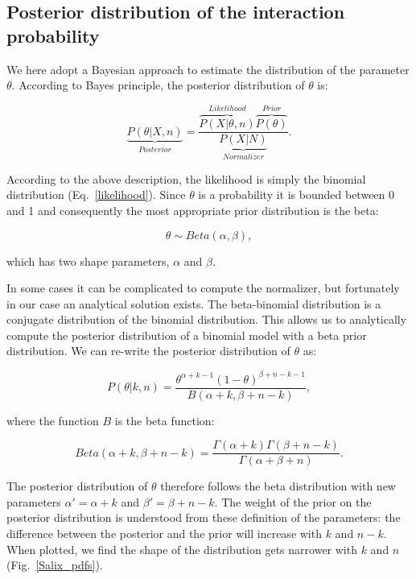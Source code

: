 \documentclass[12pt]{article}
\begin{document}
    \subsection*{Posterior distribution of the interaction probability}

      We here adopt a Bayesian approach to estimate the distribution of the parameter $\theta$. According to Bayes principle, the posterior distribution of $\theta$ is:

      \begin{equation}
        \underbrace{P(\theta|X,n)}_{Posterior} = \frac{\overbrace{P(X|\theta,n)}^{Likelihood}\overbrace{P(\theta)}^{Prior}}{\underbrace{P(X|N)}_{Normalizer}} .
        \label{posterior}
      \end{equation}

      According to the above description, the likelihood is simply the binomial distribution (Eq.~\ref{likelihood}). Since $\theta$ is a probability it is bounded between 0 and 1 and consequently the most appropriate prior distribution is the beta:

      \begin{equation}
        \theta \sim Beta(\alpha,\beta) , \label{prior}
      \end{equation}

      \noindent which has two shape parameters, $\alpha$ and $\beta$. 

     In some cases it can be complicated to compute the normalizer, but fortunately in our case an analytical solution exists. The beta-binomial distribution is a conjugate distribution of the binomial distribution. This allows us to analytically compute the posterior distribution of a binomial model with a beta prior distribution. We can re-write the posterior distribution of $\theta$ as:

      \begin{equation}
        P(\theta|k,n) = \frac{\theta^{\alpha+k-1}(1-\theta)^{\beta+n-k-1}}{B(\alpha+k,\beta+n-k)} , \label{posterior}
      \end{equation}

      \noindent where the function $B$ is the beta function:

      \begin{equation}
        Beta(\alpha+k,\beta+n-k) = \frac{\Gamma(\alpha+k)\Gamma(\beta+n-k)}{\Gamma(\alpha+\beta+n)} . \label{betafunction}
      \end{equation}

      The posterior distribution of $\theta$ therefore follows the beta distribution with new parameters $\alpha'= \alpha+k$ and $\beta'=\beta+n-k$. The weight of the prior on the posterior distribution is understood from these definition of the parameters: the difference between the posterior and the prior will increase with $k$ and $n-k$. When plotted, we find the shape of the distribution gets narrower with $k$ and $n$ (Fig.~\ref{Salix_pdfs}). 
\end{document}
